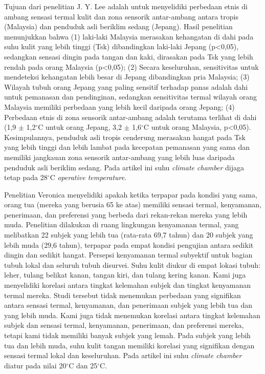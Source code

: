 Tujuan dari penelitian J. Y. Lee\cite{paper21JYLee} adalah untuk menyelidiki perbedaan etnis di ambang sensasi termal kulit dan zona sensorik antar-ambang antara tropis (Malaysia) dan penduduk asli beriklim sedang (Jepang). Hasil penelitian menunjukkan bahwa (1) laki-laki Malaysia merasakan kehangatan di dahi pada suhu kulit yang lebih tinggi (Tsk) dibandingkan laki-laki Jepang (p<0,05), sedangkan sensasi dingin pada tangan dan kaki, dirasakan pada Tsk yang lebih rendah pada orang Malaysia (p<0,05); (2) Secara keseluruhan, sensitivitas untuk mendeteksi kehangatan lebih besar di Jepang dibandingkan pria Malaysia; (3) Wilayah tubuh orang Jepang yang paling sensitif terhadap panas adalah dahi untuk pemanasan dan pendinginan, sedangkan sensitivitas termal wilayah orang Malaysia memiliki perbedaan yang lebih kecil daripada orang Jepang; (4) Perbedaan etnis di zona sensorik antar-ambang adalah terutama terlihat di dahi (1,9 $\pm$ 1,2$^\circ$C untuk orang Jepang, 3,2 $\pm$ 1,6$^\circ$C untuk orang Malaysia, p<0,05). Kesimpulannya, penduduk asli tropis cenderung merasakan hangat pada Tsk yang lebih tinggi dan lebih lambat pada kecepatan pemanasan yang sama dan memiliki jangkauan zona sensorik antar-ambang yang lebih luas daripada penduduk asli beriklim sedang. Pada artikel ini suhu \textit{climate chamber} dijaga tetap pada 28$^\circ$C \textit{operative temperature}.

Penelitian Veronica\cite{paper21Veronica} menyelidiki apakah ketika terpapar pada kondisi yang sama, orang tua (mereka yang berusia 65 ke atas) memiliki sensasi termal, kenyamanan, penerimaan, dan preferensi yang berbeda dari rekan-rekan mereka yang lebih muda. Penelitian dilakukan di ruang lingkungan kenyamanan termal, yang melibatkan 22 subjek yang lebih tua (rata-rata 69,7 tahun) dan 20 subjek yang lebih muda (29,6 tahun), terpapar pada empat kondisi pengujian antara sedikit dingin dan sedikit hangat. Persepsi kenyamanan termal subyektif untuk bagian tubuh lokal dan seluruh tubuh disurvei. Suhu kulit diukur di empat lokasi tubuh: leher, tulang belikat kanan, tangan kiri, dan tulang kering kanan. Kami juga menyelidiki korelasi antara tingkat kelemahan subjek dan tingkat kenyamanan termal mereka. Studi tersebut tidak menemukan perbedaan yang signifikan antara sensasi termal, kenyamanan, dan penerimaan subjek yang lebih tua dan yang lebih muda. Kami juga tidak menemukan korelasi antara tingkat kelemahan subjek dan sensasi termal, kenyamanan, penerimaan, dan preferensi mereka, tetapi kami tidak memiliki banyak subjek yang lemah. Pada subjek yang lebih tua dan lebih muda, suhu kulit tangan memiliki korelasi yang signifikan dengan sensasi termal lokal dan keseluruhan. Pada artikel ini suhu \textit{climate chamber} diatur pada nilai 20$^\circ$C dan 25$^\circ$C.

